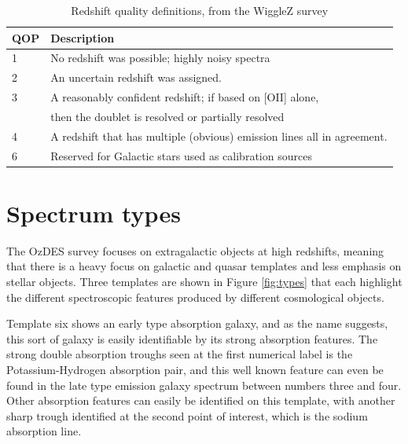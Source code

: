 \documentclass[titlesmallcaps, examinerscopy, copyrightpage]{uqthesis}
\begin{document}
\begin{table}[h]
\centering
\caption{Redshift quality definitions, from the WiggleZ survey \cite{Drinkwater21012010}}
\begin{tabular}{ll}
\hline
QOP &  Description                                                                                                      \\
\hline
1             & No redshift was possible; highly noisy spectra                                                                   \\
2             & An uncertain redshift was assigned.                                                                              \\
3             & A reasonably confident redshift; if based on {[}OII{]} alone, \\
& then the doublet is resolved or partially resolved \\
4             & A redshift that has multiple (obvious) emission lines all in agreement.                                          \\
6              & Reserved for Galactic stars used as calibration sources \\
\hline                                                    
\end{tabular}
\label{tab:qop}
\end{table}



\section{Spectrum types}

The OzDES survey focuses on extragalactic objects at high redshifts, meaning that there is a heavy focus on galactic and quasar templates and less emphasis on stellar objects. Three templates are shown in Figure \ref{fig:types} that each highlight the different spectroscopic features produced by different cosmological objects.

Template six shows an early type absorption galaxy, and as the name suggests, this sort of galaxy is easily identifiable by its strong absorption features. The strong double absorption troughs seen at the first numerical label is the Potassium-Hydrogen absorption pair, and this well known feature can even be found in the late type emission galaxy spectrum between numbers three and four. Other absorption features can easily be identified on this template, with another sharp trough identified at the second point of interest, which is the sodium absorption line.
\end{document}
